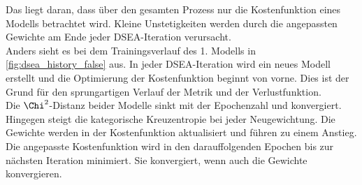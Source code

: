 Das liegt daran, dass über den gesamten Prozess nur die Kostenfunktion eines Modells betrachtet wird.
Kleine Unstetigkeiten werden durch die angepassten Gewichte am Ende jeder DSEA-Iteration verursacht.
\\
Anders sieht es bei dem Trainingsverlauf des 1. Modells in \autoref{fig:dsea_history_false} aus.
In jeder DSEA-Iteration wird ein neues Modell erstellt und die Optimierung der Kostenfunktion beginnt von vorne.
Dies ist der Grund für den sprungartigen Verlauf der Metrik und der Verlustfunktion.
\\
Die $\Chi^2$-Distanz beider Modelle sinkt mit der Epochenzahl und konvergiert.
Hingegen steigt die kategorische Kreuzentropie bei jeder Neugewichtung.
Die Gewichte werden in der Kostenfunktion aktualisiert und führen zu einem Anstieg.
Die angepasste Kostenfunktion wird in den darauffolgenden Epochen bis zur nächsten Iteration minimiert.
Sie konvergiert, wenn auch die Gewichte konvergieren.

